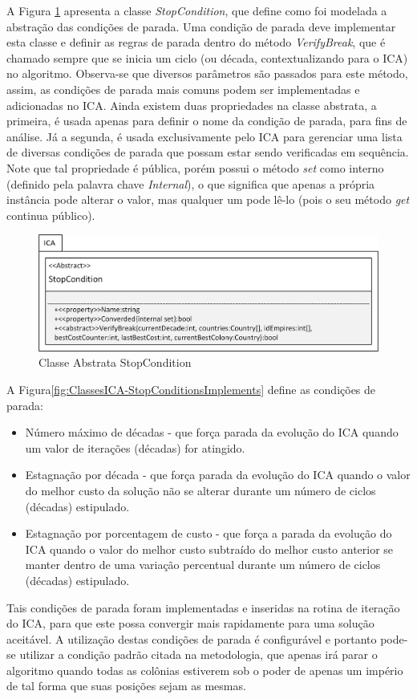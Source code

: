 A Figura \ref{fig:ClassesICA-StopCondition} apresenta a classe \emph{StopCondition}, que define como foi modelada a abstração das condições de parada. Uma condição de parada deve implementar esta classe e definir as regras de parada dentro do método \emph{VerifyBreak}, que é chamado sempre que se inicia um ciclo (ou década, contextualizando para o ICA) no algoritmo. Observa-se que diversos parâmetros são passados para este método, assim, as condições de parada mais comuns podem ser implementadas e adicionadas no ICA. Ainda existem duas propriedades na classe abstrata, a primeira, é usada apenas para definir o nome da condição de parada, para fins de análise. Já a segunda, é usada exclusivamente pelo ICA para gerenciar uma lista de diversas condições de parada que possam estar sendo verificadas em sequência. Note que tal propriedade é pública, porém possui o método \emph{set} como interno (definido pela palavra chave \emph{Internal}), o que significa que apenas a própria instância pode alterar o valor, mas qualquer um pode lê-lo (pois o seu método \emph{get} continua público).
 
\begin{figure}[h]
	\centering	
	\includegraphics[scale=1]{Figuras/ClassesICA-StopCondition.png}
	\caption{Classe Abstrata StopCondition}
	\label{fig:ClassesICA-StopCondition}
	\end{figure}

A Figura\ref{fig:ClassesICA-StopConditionsImplements} define as condições de parada:
\begin{itemize}
\item Número máximo de décadas - que força parada da evolução do ICA quando um valor de iterações (décadas) for atingido. 
\item Estagnação por década - que força parada da evolução do ICA quando o valor do melhor custo da solução não se alterar durante um número de ciclos (décadas) estipulado.
\item Estagnação por porcentagem de custo - que força a parada da evolução do ICA quando o valor do melhor custo subtraído do melhor custo anterior  se manter dentro de uma variação percentual durante um número de ciclos (décadas) estipulado.
\end{itemize}
Tais condições de parada foram implementadas e inseridas na rotina de iteração do ICA, para que este possa convergir mais rapidamente para uma solução aceitável. A utilização destas condições de parada é configurável e portanto pode-se utilizar a condição padrão citada na metodologia, que apenas irá parar o algoritmo quando todas as colônias estiverem sob o poder de apenas um império de tal forma que suas posições sejam as mesmas.

